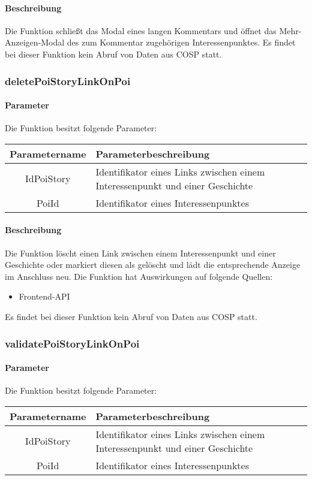 \paragraph{Beschreibung} Die Funktion schließt das Modal eines langen Kommentars und öffnet das {\glqq Mehr-Anzeigen\grqq}-Modal des zum Kommentar zugehörigen Interessenpunktes. Es findet bei dieser Funktion kein Abruf von Daten aus {\glqq COSP\grqq} statt.
\subsubsection{deletePoiStoryLinkOnPoi}
\paragraph{Parameter} Die Funktion besitzt folgende Parameter:
\begin{table}[H]
	\begin{tabular}{|c|p{11cm}|}
		\hline
		\textbf{Parametername} & \textbf{Parameterbeschreibung} \\ \hline
		IdPoiStory & Identifikator eines Links zwischen einem Interessenpunkt und einer Geschichte\\ \hline
		PoiId      & Identifikator eines Interessenpunktes \\ \hline
	\end{tabular}
\end{table}
\paragraph{Beschreibung} Die Funktion löscht einen Link zwischen einem Interessenpunkt und einer Geschichte oder markiert diesen als gelöscht und lädt die entsprechende Anzeige im Anschluss neu. Die Funktion hat Auswirkungen auf folgende Quellen:
\begin{itemize}
	\item Frontend-API
\end{itemize}
Es findet bei dieser Funktion kein Abruf von Daten aus {\glqq COSP\grqq} statt.
\subsubsection{validatePoiStoryLinkOnPoi}
\paragraph{Parameter} Die Funktion besitzt folgende Parameter:
\begin{table}[H]
	\begin{tabular}{|c|p{11cm}|}
		\hline
		\textbf{Parametername} & \textbf{Parameterbeschreibung} \\ \hline
		IdPoiStory & Identifikator eines Links zwischen einem Interessenpunkt und einer Geschichte\\ \hline
		PoiId      & Identifikator eines Interessenpunktes \\ \hline
	\end{tabular}
\end{table}
